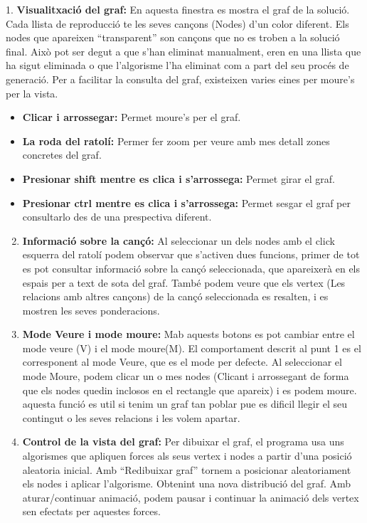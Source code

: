 \documentclass[a4paper,10pt,oneside]{sphinxmanual}
\begin{document}
1. \textbf{Visualitxació del graf:} En aquesta finestra es mostra el graf de la solució. Cada llista de reproducció te les seves cançons (Nodes) d'un color diferent. Els nodes que apareixen ``transparent'' son cançons que no es troben a la solució final. Això pot ser degut a que s'han eliminat manualment, eren en una llista que ha sigut eliminada o que l'algorisme l'ha eliminat com a part del seu procés de generació.
Per a facilitar la consulta del graf, existeixen varies eines per moure's per la vista.
\begin{itemize}
\item {} 
\textbf{Clicar i arrossegar:} Permet moure's per el graf.

\item {} 
\textbf{La roda del ratolí:} Permer fer zoom per veure amb mes detall zones concretes del graf.

\item {} 
\textbf{Presionar shift mentre es clica i s'arrossega:} Permet girar el graf.

\item {} 
\textbf{Presionar ctrl mentre es clica i s'arrossega:} Permet sesgar el graf per consultarlo des de una prespectiva diferent.

\end{itemize}
\begin{enumerate}
\setcounter{enumi}{1}
\item {} 
\textbf{Informació sobre la cançó:} Al seleccionar un dels nodes amb el click esquerra del ratolí podem observar que s'activen dues funcions, primer de tot es pot consultar informació sobre la cançó seleccionada, que apareixerà en els espais per a text de sota del graf. També podem veure que els vertex (Les relacions amb altres cançons) de la cançó seleccionada es resalten, i es mostren les seves ponderacions.

\item {} 
\textbf{Mode Veure i mode moure:} Mab aquests botons es pot cambiar entre el mode veure (V) i el mode moure(M). El comportament descrit al punt 1 es el corresponent al mode Veure, que es el mode per defecte. Al seleccionar el mode Moure, podem clicar un o mes nodes (Clicant i arrossegant de forma que els nodes quedin inclosos en el rectangle que apareix) i es podem moure. aquesta funció es util si tenim un graf tan poblar pue es dificil llegir el seu contingut o les seves relacions i les volem apartar.

\item {} 
\textbf{Control de la vista del graf:} Per dibuixar el graf, el programa usa uns algorismes que apliquen forces als seus vertex i nodes a partir d'una posició aleatoria inicial. Amb ``Redibuixar graf'' tornem a posicionar aleatoriament els nodes i aplicar l'algorisme. Obtenint una nova distribució del graf. Amb aturar/continuar animació, podem pausar i continuar la animació dels vertex sen efectats per aquestes forces.

\end{enumerate}
\end{document}
